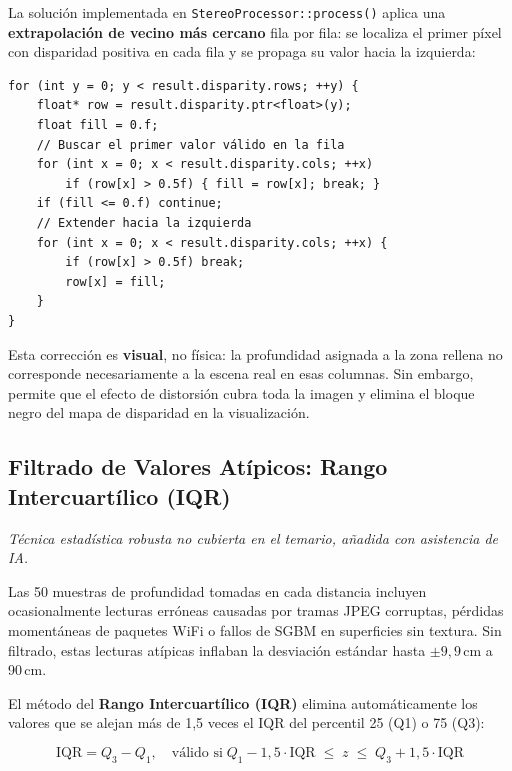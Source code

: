 \documentclass[12pt, a4paper]{article}
\begin{document}
La solución implementada en \texttt{StereoProcessor::process()} aplica una
\textbf{extrapolación de vecino más cercano} fila por fila: se localiza el primer
píxel con disparidad positiva en cada fila y se propaga su valor hacia la izquierda:

\begin{lstlisting}[style=cppstyle, caption={Relleno de región inválida en StereoProcessor.cpp.}]
for (int y = 0; y < result.disparity.rows; ++y) {
    float* row = result.disparity.ptr<float>(y);
    float fill = 0.f;
    // Buscar el primer valor válido en la fila
    for (int x = 0; x < result.disparity.cols; ++x)
        if (row[x] > 0.5f) { fill = row[x]; break; }
    if (fill <= 0.f) continue;
    // Extender hacia la izquierda
    for (int x = 0; x < result.disparity.cols; ++x) {
        if (row[x] > 0.5f) break;
        row[x] = fill;
    }
}
\end{lstlisting}

\noindent Esta corrección es \textbf{visual}, no física: la profundidad asignada a la
zona rellena no corresponde necesariamente a la escena real en esas columnas. Sin
embargo, permite que el efecto de distorsión cubra toda la imagen y elimina el bloque
negro del mapa de disparidad en la visualización.

\subsection{Filtrado de Valores Atípicos: Rango Intercuartílico (IQR)}
\label{sec:iqr}

\emph{Técnica estadística robusta no cubierta en el temario, añadida con asistencia de IA.}

Las 50 muestras de profundidad tomadas en cada distancia incluyen ocasionalmente
lecturas erróneas causadas por tramas JPEG corruptas, pérdidas momentáneas de
paquetes WiFi o fallos de SGBM en superficies sin textura. Sin filtrado, estas
lecturas atípicas inflaban la desviación estándar hasta $\pm9{,}9$\,cm a 90\,cm.

El método del \textbf{Rango Intercuartílico (IQR)} elimina automáticamente los
valores que se alejan más de 1,5 veces el IQR del percentil 25 (Q1) o 75 (Q3):

\begin{equation}
\label{eq:iqr}
  \text{IQR} = Q_3 - Q_1,
  \quad
  \text{válido si}\;
  Q_1 - 1{,}5\cdot\text{IQR} \;\leq\; z \;\leq\; Q_3 + 1{,}5\cdot\text{IQR}
\end{equation}
\end{document}
